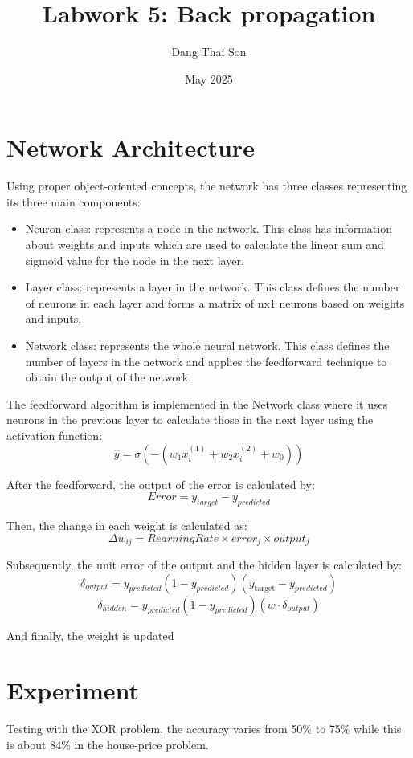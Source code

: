 \documentclass{article}
\title{Labwork 5: Back propagation}
\author{Dang Thai Son}
\date{May 2025}
\begin{document}
\maketitle

\section{Network Architecture}
Using proper object-oriented concepts, the network has three classes representing its three main components: 

\begin{itemize}
    \item Neuron class: represents a node in the network. This class has information about weights and inputs which are used to calculate the linear sum and sigmoid value for the node in the next layer.
    \item Layer class: represents a layer in the network. This class defines the number of neurons in each layer and forms a matrix of nx1 neurons based on weights and inputs.
    \item Network class: represents the whole neural network. This class defines the number of layers in the network and applies the feedforward technique to obtain the output of the network.
\end{itemize}

The feedforward algorithm is implemented in the Network class where it uses neurons in the previous layer to calculate those in the next layer using the activation function:
\[
\hat{y} = \sigma\left(-\left(w_1 x_i^{(1)} + w_2 x_i^{(2)} + w_0\right)\right)
\]

After the feedforward, the output of the error is calculated by:
\[
Error = y_{target} - y_{predicted}
\]

Then, the change in each weight is calculated as:
\[
\Delta w_{ij} = RearningRate \times error_j \times output_j
\]

Subsequently, the unit error of the output and the hidden layer is calculated by:
\[
\delta_{output} = y_{predicted} (1 - y_{predicted})(y_{\text{target}} - y_{predicted})
\]
\[
\delta_{hidden} = y_{predicted} (1 - y_{predicted})(w \cdot \delta_{output})
\]

And finally, the weight is updated

\section{Experiment}
Testing with the XOR problem, the accuracy varies from 50\% to 75\% while this is about 84\% in the house-price problem.
\end{document}
